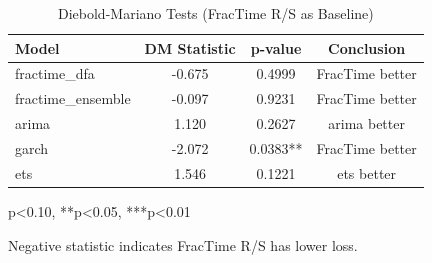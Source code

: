 \begin{table}[htbp]
\centering
\caption{Diebold-Mariano Tests (FracTime R/S as Baseline)}
\label{tab:dm_tests}
\begin{tabular}{lccc}
\toprule
Model & DM Statistic & p-value & Conclusion \\
\midrule
fractime\_dfa & -0.675 & 0.4999 & FracTime better \\
fractime\_ensemble & -0.097 & 0.9231 & FracTime better \\
arima & 1.120 & 0.2627 & arima better \\
garch & -2.072 & 0.0383** & FracTime better \\
ets & 1.546 & 0.1221 & ets better \\
\bottomrule
\end{tabular}
\begin{tablenotes}
\small
\item *p<0.10, **p<0.05, ***p<0.01
\item Negative statistic indicates FracTime R/S has lower loss.
\end{tablenotes}
\end{table}